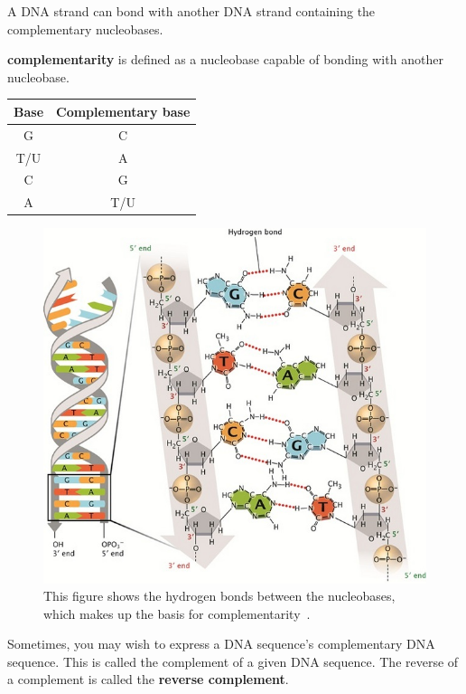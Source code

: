 \documentclass[12pt]{article}
\theoremstyle{definition}
\begin{document}
A DNA strand can bond with another DNA strand containing the complementary nucleobases.

\begin{definition}
\textbf{complementarity} is defined as a nucleobase capable of bonding with another nucleobase.
\begin{center}
\begin{tabular}{|c|c|}
\hline
Base & Complementary base \\
\hline
G & C \\
T/U & A \\
C & G \\
A & T/U \\
\hline
\end{tabular}
\end{center}
\end{definition}

\begin{figure}[H]
	\label{Complementarity}
	\begin{center}
		\includegraphics[scale=2.5]{complementarity.jpg}	
	\end{center}
	\caption{This figure shows the hydrogen bonds between the nucleobases, which makes up the basis for complementarity~\cite{DNA-nature}.}
\end{figure}

Sometimes, you may wish to express a DNA sequence's complementary DNA sequence. This is called the complement of a given DNA sequence. The reverse of a complement is called the \textbf{reverse complement}.
\end{document}
